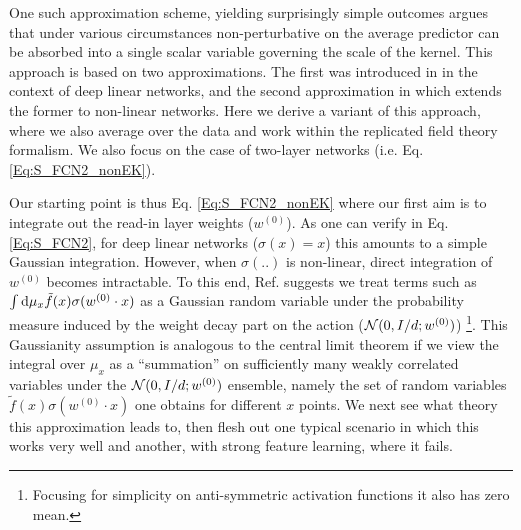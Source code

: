 One such approximation scheme, yielding surprisingly simple outcomes argues that under various circumstances non-perturbative on the average predictor can be absorbed into a single scalar variable governing the scale of the kernel. This approach is based on two approximations. The first was introduced in \cite{LiSompolinsky2021} in the context of deep linear networks, and the second approximation in \cite{ariosto2022statistical} which extends the former to non-linear networks. Here we derive a variant of this approach, where we also average over the data and work within the replicated field theory formalism. We also focus on the case of two-layer networks (i.e. Eq. \ref{Eq:S_FCN2_nonEK}).

Our starting point is thus Eq. \ref{Eq:S_FCN2_nonEK} where our first aim is to integrate out the read-in layer weights (${w}^{(0)}$). As one can verify in Eq. \ref{Eq:S_FCN2}, for deep linear networks ($\sigma(x)=x$) this amounts to a simple Gaussian integration. However, when $\sigma(..)$ is non-linear, direct integration of ${w}^{(0)}$ becomes intractable. To this end, Ref. \cite{ariosto2022statistical} suggests we treat terms such as $\int \text{d} \mu_x \tilde{f}(x) \sigma({w}^{(0)} \cdot x)$ as a Gaussian random variable under the probability measure induced by the weight decay part on the action (${\cal N}(0,I/d;w^{(0)})$) \footnote{Focusing for simplicity on anti-symmetric activation functions it also has zero mean.}. 
This Gaussianity assumption is analogous to the central limit theorem if we view the integral over $\mu_x$ as a ``summation'' on sufficiently many weakly correlated variables under the ${\cal N}(0,I/d;w^{(0)})$ ensemble, namely the set of random variables $\tilde{f}(x) \sigma({w}^{(0)} \cdot x)$ one obtains for different $x$ points. We next see what theory this approximation leads to, then flesh out one typical scenario in which this works very well and another, with strong feature learning, where it fails. 

